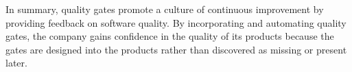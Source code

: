 \noindent In summary, quality gates promote a culture of continuous improvement by providing feedback on software 
quality. By incorporating and automating quality gates, the company gains confidence in the quality of its products 
because the gates are designed into the products rather than discovered as missing or present later.

